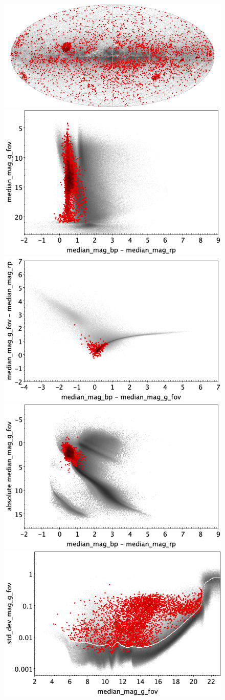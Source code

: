 \documentclass[longauth]{aa}
\begin{document}
\begin{appendix}
\begin{figure}
\centering
{} \includegraphics[width=0.6\hsize]{figures/appendix/DSCT_trn_sky.png} \\ %
\vspace{4mm}
 \includegraphics[width=0.45\hsize]{figures/appendix/DSCT_trn_cm.png}  %
\hspace{2mm}
 \includegraphics[width=0.45\hsize]{figures/appendix/DSCT_trn_cc.png} \\ %
\vspace{4mm}
 \includegraphics[width=0.45\hsize]{figures/appendix/DSCT_trn_cam.png}  %
\hspace{2mm}
 \includegraphics[width=0.45\hsize]{figures/appendix/DSCT_trn_msd.png} \\ %

\end{figure}
\end{appendix}
\end{document}
